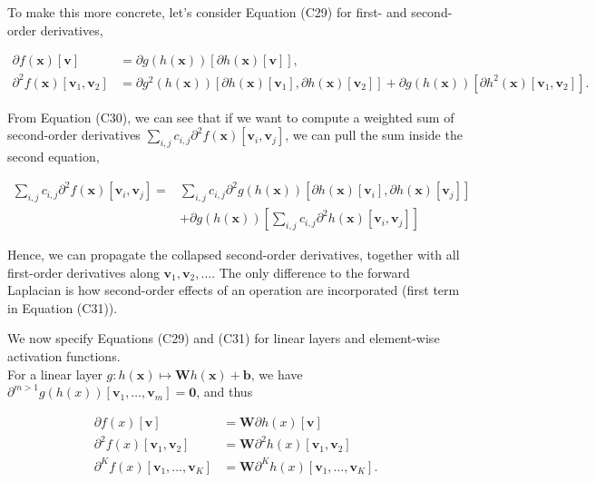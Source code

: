 \documentclass[10pt]{article}
\begin{document}
To make this more concrete, let's consider Equation (C29) for first- and second-order derivatives,


\begin{align*}
\partial f(\boldsymbol{x})[\boldsymbol{v}] & =\partial g(h(\boldsymbol{x}))[\partial h(\boldsymbol{x})[\boldsymbol{v}]],  \tag{C30a}\\
\partial^{2} f(\boldsymbol{x})\left[\boldsymbol{v}_{1}, \boldsymbol{v}_{2}\right] & =\partial g^{2}(h(\boldsymbol{x}))\left[\partial h(\boldsymbol{x})\left[\boldsymbol{v}_{1}\right], \partial h(\boldsymbol{x})\left[\boldsymbol{v}_{2}\right]\right]+\partial g(h(\boldsymbol{x}))\left[\partial h^{2}(\boldsymbol{x})\left[\boldsymbol{v}_{1}, \boldsymbol{v}_{2}\right]\right] . \tag{C30b}
\end{align*}


From Equation (C30), we can see that if we want to compute a weighted sum of second-order derivatives $\sum_{i, j} c_{i, j} \partial^{2} f(\boldsymbol{x})\left[\boldsymbol{v}_{i}, \boldsymbol{v}_{j}\right]$, we can pull the sum inside the second equation,


\begin{align*}
\sum_{i, j} c_{i, j} \partial^{2} f(\boldsymbol{x})\left[\boldsymbol{v}_{i}, \boldsymbol{v}_{j}\right]= & \sum_{i, j} c_{i, j} \partial^{2} g(h(\boldsymbol{x}))\left[\partial h(\boldsymbol{x})\left[\boldsymbol{v}_{i}\right], \partial h(\boldsymbol{x})\left[\boldsymbol{v}_{j}\right]\right] \\
& +\partial g(h(\boldsymbol{x}))\left[\sum_{i, j} c_{i, j} \partial^{2} h(\boldsymbol{x})\left[\boldsymbol{v}_{i}, \boldsymbol{v}_{j}\right]\right] \tag{C31}
\end{align*}


Hence, we can propagate the collapsed second-order derivatives, together with all first-order derivatives along $\boldsymbol{v}_{1}, \boldsymbol{v}_{2}, \ldots$. The only difference to the forward Laplacian is how second-order effects of an operation are incorporated (first term in Equation (C31)).

We now specify Equations (C29) and (C31) for linear layers and element-wise activation functions.\\
For a linear layer $g: h(\boldsymbol{x}) \mapsto \boldsymbol{W} h(\boldsymbol{x})+\boldsymbol{b}$, we have $\partial^{m>1} g(h(x))\left[\boldsymbol{v}_{1}, \ldots, \boldsymbol{v}_{m}\right]=\mathbf{0}$, and thus


\begin{align*}
\partial f(x)[\boldsymbol{v}] & =\boldsymbol{W} \partial h(x)[\boldsymbol{v}]  \tag{C32a}\\
\partial^{2} f(x)\left[\boldsymbol{v}_{1}, \boldsymbol{v}_{2}\right] & =\boldsymbol{W} \partial^{2} h(x)\left[\boldsymbol{v}_{1}, \boldsymbol{v}_{2}\right]  \tag{C32b}\\
\partial^{K} f(x)\left[\boldsymbol{v}_{1}, \ldots, \boldsymbol{v}_{K}\right] & =\boldsymbol{W} \partial^{K} h(x)\left[\boldsymbol{v}_{1}, \ldots, \boldsymbol{v}_{K}\right] . \tag{C32c}
\end{align*}
\end{document}
